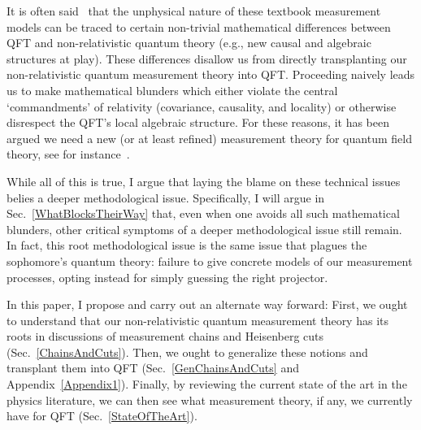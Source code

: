 \documentclass[12pt,prd,superscriptaddress,floatfix,amsmath,amssymb,amsfonts,nofootinbib]{revtex4-2}
\begin{document}
It is often said~\cite{pologomez2021detectorbased,Jubb2022,BorstenJubbKells,fewster1,fewster2,fewster3,Anastopoulos2022,Sorkin,TaleOfTwo,Ruep2021,JoseMariaEdu,Sorkin,Redhead1995,Dowker,Dowker2,borsten,alvaro,Adam} that the unphysical nature of these textbook measurement models can be traced to certain non-trivial mathematical differences between QFT and non-relativistic quantum theory (e.g., new causal and algebraic structures at play). These differences disallow us from directly transplanting our non-relativistic quantum measurement theory into QFT. Proceeding naively leads us to make mathematical blunders which either violate the central `commandments' of relativity (covariance, causality, and locality)\cite{Sorkin,Redhead1995,Dowker,Dowker2,borsten,alvaro,Adam} or otherwise disrespect the QFT's local algebraic structure. For these reasons, it has been argued we need a new (or at least refined) measurement theory for quantum field theory, see for instance~\cite{pologomez2021detectorbased,Jubb2022,fewster2}.

While all of this is true, I argue that laying the blame on these technical issues belies a deeper methodological issue. Specifically, I will argue in Sec.~\ref{WhatBlocksTheirWay} that, even when one avoids all such mathematical blunders, other critical symptoms of a deeper methodological issue still remain. In fact, this root methodological issue is the same issue that plagues the sophomore's quantum theory: failure to give concrete models of our measurement processes, opting instead for simply guessing the right projector.

In this paper, I propose and carry out an alternate way forward: First, we ought to understand that our non-relativistic quantum measurement theory has its roots in discussions of measurement chains and Heisenberg cuts (Sec.~\ref{ChainsAndCuts}). Then, we ought to generalize these notions and transplant them into QFT (Sec.~\ref{GenChainsAndCuts} and Appendix~\ref{Appendix1}). Finally, by reviewing the current state of the art in the physics literature, we can then see what measurement theory, if any, we currently have for QFT (Sec.~\ref{StateOfTheArt}).
\end{document}
